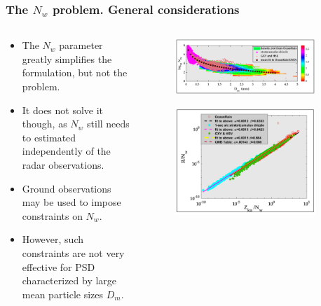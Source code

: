 \documentclass{beamer}
\begin{document}
\begin{frame}
\frametitle{The $N_w$ problem. General considerations}
\begin{columns}
    \begin{column}{0.5\textwidth}
        \begin{itemize}
            \item The $N_w$ parameter greatly simplifies the formulation, but
            not the problem.
            \item It does not solve it though, as $N_w$ still needs to
            estimated independently of the radar observations.
            \item Ground observations may be used to impose constraints on
            $N_w$.
            \item However, such constraints are not very effective for 
            PSD characterized by large mean particle sizes $D_m$.
        \end{itemize}
    \end{column}
    \begin{column}{0.5\textwidth}
        \begin{figure}
            \begin{center}
            \includegraphics[width=0.9\textwidth]{Figures/fig3.png}
            \end{center}
        \end{figure}
        \begin{figure}
            \begin{center}
            \includegraphics[width=0.9\textwidth]{Figures/fig4.png}
            \end{center}
        \end{figure}
    \end{column}
\end{columns}
\end{frame}
\end{document}
